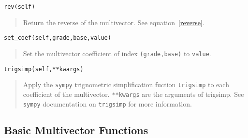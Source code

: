 \documentclass[10pt]{article}
\newcommand{\T}[1]{\texttt{#1}}
\begin{document}
\T{rev(self)}
\begin{quote}
   Return the reverse of the multivector.  See equation~\ref{reverse}.
\end{quote}

\T{set\_coef(self,grade,base,value)}
\begin{quote}
   Set the multivector coefficient of index \T{(grade,base)} to \T{value}.
\end{quote}

\T{trigsimp(self,**kwargs)}
\begin{quote}
   Apply the \T{sympy} trignometric simplification fuction \T{trigsimp} to
   each coefficient of the multivector. \T{**kwargs} are the arguments of
   trigsimp.  See \T{sympy} documentation on \T{trigsimp} for more information.
\end{quote}

\subsection{Basic Multivector Functions}
\end{document}
